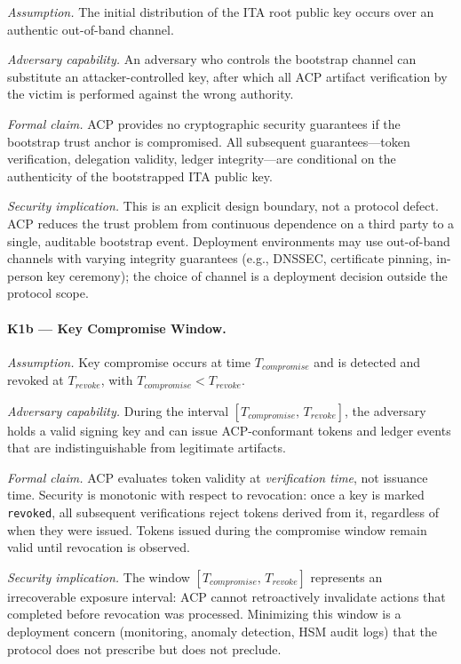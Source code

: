\documentclass[11pt]{article}
\theoremstyle{definition}
\begin{document}
\textit{Assumption.}
The initial distribution of the ITA root public key occurs over an authentic out-of-band channel.

\textit{Adversary capability.}
An adversary who controls the bootstrap channel can substitute an attacker-controlled key,
after which all ACP artifact verification by the victim is performed against the wrong authority.

\textit{Formal claim.}
ACP provides no cryptographic security guarantees if the bootstrap trust anchor is compromised.
All subsequent guarantees---token verification, delegation validity, ledger integrity---are
conditional on the authenticity of the bootstrapped ITA public key.

\textit{Security implication.}
This is an explicit design boundary, not a protocol defect.
ACP reduces the trust problem from continuous dependence on a third party
to a single, auditable bootstrap event.
Deployment environments may use out-of-band channels with varying integrity guarantees
(e.g., DNSSEC, certificate pinning, in-person key ceremony);
the choice of channel is a deployment decision outside the protocol scope.

\paragraph{K1b --- Key Compromise Window.}

\textit{Assumption.}
Key compromise occurs at time $T_{\mathit{compromise}}$ and is detected and revoked at
$T_{\mathit{revoke}}$, with $T_{\mathit{compromise}} < T_{\mathit{revoke}}$.

\textit{Adversary capability.}
During the interval $[T_{\mathit{compromise}},\, T_{\mathit{revoke}}]$,
the adversary holds a valid signing key and can issue ACP-conformant tokens and ledger events
that are indistinguishable from legitimate artifacts.

\textit{Formal claim.}
ACP evaluates token validity at \emph{verification time}, not issuance time.
Security is monotonic with respect to revocation:
once a key is marked \texttt{revoked}, all subsequent verifications reject tokens derived from it,
regardless of when they were issued.
Tokens issued during the compromise window remain valid until revocation is observed.

\textit{Security implication.}
The window $[T_{\mathit{compromise}},\, T_{\mathit{revoke}}]$ represents an irrecoverable
exposure interval: ACP cannot retroactively invalidate actions that completed before revocation
was processed.
Minimizing this window is a deployment concern (monitoring, anomaly detection, HSM audit logs)
that the protocol does not prescribe but does not preclude.
\end{document}
